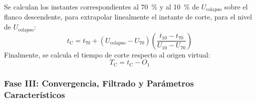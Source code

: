 \begin{enumerate}[resume]
\begin{equation}
    \end{equation}
    Se calculan los instantes correspondientes al \qty{70}{\percent} y al \qty{10}{\percent} de $U_\text{colapso}$ sobre el flanco descendente, para extrapolar linealmente el instante de corte, para el nivel de $U_{\text{colapso}}$:
    \begin{equation}
        t_\text{C} = t_{70} + (U_{\text{colapso}} - U_{70}) \left(\frac{t_{10} - t_{70}}{U_{10} - U_{70}}\right)
    \end{equation}
    Finalmente, se calcula el tiempo de corte respecto al origen virtual:
    \begin{equation}
        T_\text{C} = t_\text{C} - O_1
    \end{equation}
\end{enumerate}

\subsubsection{Fase III: Convergencia, Filtrado y Parámetros Característicos}

